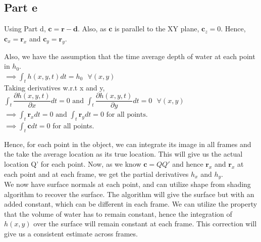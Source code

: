\documentclass[11pt]{article}
\begin{document}
\subsection*{Part e}
Using Part d, $\mathbf{c} = \mathbf{r} - \mathbf{d}$. Also, as $\mathbf{c}$ is parallel to the XY plane, $\mathbf{c}_{z} = 0$. Hence, $\mathbf{c}_{x} = \mathbf{r}_{x}$ and $\mathbf{c}_{y} = \mathbf{r}_{y}$.

Also, we have the assumption that the time average depth of water at each point in $h_{0}$.\\

$
\implies \int_{t} h(x,y,t) dt = h_{0}   \text{ } \forall (x,y)
$\\
Taking derivatives w.r.t x and y,\\
$
\int_{t} \dfrac{\partial{h(x,y,t)}}{\partial{x}} dt = 0 \text{  and  } \int_{t} \dfrac{\partial{h(x,y,t)}}{\partial{y}} dt = 0   \text{ } \forall (x,y) 
$\\
$
\implies \int_{t} \mathbf{r}_{x} dt = 0 \text{ and } \int_{t} \mathbf{r}_{y} dt = 0 \text{ for all points. }
$\\
$\implies \int_{t} \mathbf{c} dt = 0 $ for all points.

Hence, for each point in the object, we can integrate its image in all frames and the take the average location as its true location. This will give us the actual location Q' for each point. Now, as we know $\mathbf{c} = QQ'$ and hence $\mathbf{r}_{x}$ and $\mathbf{r}_{x}$ at each point and at each frame, we get the partial derivatives $h_{x}$ and $h_{y}$.\\

We now have surface normals at each point, and can utilize shape from shading algorithm to recover the surface. The algorithm will give the surface but with an added constant, which can be different in each frame. We can utilize the property that the volume of water has to remain constant, hence the integration of $h(x,y)$ over the surface will remain constant at each frame. This correction will give us a consistent estimate across frames.
\end{document}
